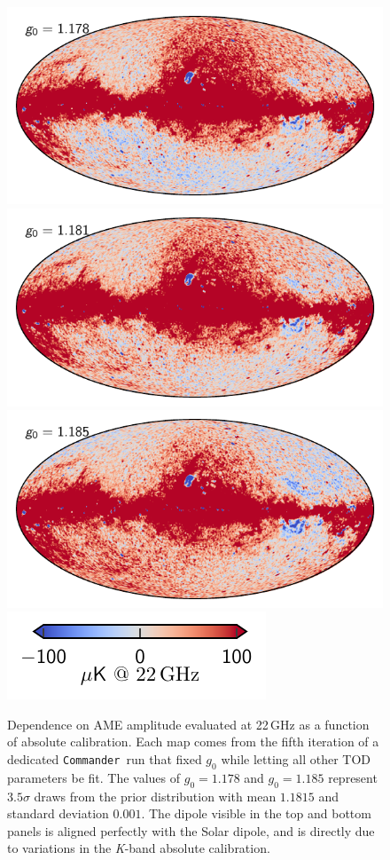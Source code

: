 \documentclass[twocolumn]{../../common/aa}
\def\commander{\texttt{Commander}}
\newcommand{\K}[0]{\textit K}
\begin{document}
\begin{figure}
	\centering
	\includegraphics[width=\columnwidth]{figures/ame_g01_178.pdf}
	\includegraphics[width=\columnwidth]{figures/ame_g01_181.pdf}
	\includegraphics[width=\columnwidth]{figures/ame_g01_185.pdf}
	\includegraphics[width=0.5\columnwidth]{figures/cbar_100uK.pdf}
	\caption{Dependence on AME amplitude evaluated at 22\,GHz as a function of absolute calibration. Each map comes from the fifth iteration of a dedicated \commander\ run that fixed $g_0$ while letting all other TOD parameters be fit. The values of $g_0=1.178$ and $g_0=1.185$ represent $3.5\sigma$ draws from the prior distribution with mean $1.1815$ and standard deviation $0.001$. The dipole visible in the top and bottom panels is aligned perfectly with the Solar dipole, and is directly due to variations in the \K-band absolute calibration.}
	\label{fig:g0_ame}
\end{figure}
\end{document}
